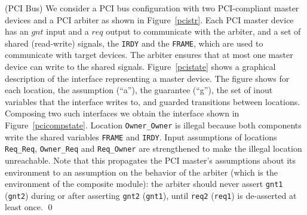 \begin{examp}{(PCI Bus)}
We consider a PCI
bus configuration with two PCI-compliant master devices and a PCI
arbiter as shown in Figure~\ref{pcistr}.
Each PCI master device has an $gnt$ input and a $req$ output to
communicate with the arbiter, and a set of shared (read-write)
signals, the \verb+IRDY+ and the \verb+FRAME+, which are used to 
communicate with target devices. 
The arbiter ensures that at most one master device can 
write to the shared signals.
Figure~\ref{pcistate} shows a graphical description of the interface
representing a master device. The figure shows for each location, the
assumption (``a''), the guarantee (``g''), the set of inout variables 
that the interface writes to, and guarded transitions between locations.
Composing two such interfaces we obtain the interface shown in 
Figure~\ref{pcicompstate}. Location \verb+Owner_Owner+ is illegal
because both components write the shared variables \verb+FRAME+ and 
\verb+IRDY+. Input assumptions of locations \verb+Req_Req+, 
\verb+Owner_Req+ and \verb+Req_Owner+ are strengthened to make the 
illegal location unreachable.
Note that this propagates the PCI master's assumptions 
about its environment to an assumption on the behavior of the arbiter 
(which is the environment of the composite module): 
the arbiter should never assert \verb+gnt1+ (\verb+gnt2+) during or
after asserting \verb+gnt2+ (\verb+gnt1+),  until \verb+req2+
(\verb+req1+) is de-asserted at least once. \qed 
\end{examp}


